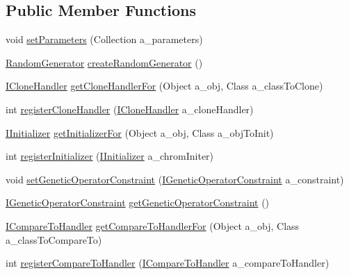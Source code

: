 \subsection*{Public Member Functions}
\begin{DoxyCompactItemize}
\item 
void \hyperlink{interfaceorg_1_1jgap_1_1_i_j_g_a_p_factory_a961d4f7aba61865c46317ddd0db81358}{set\-Parameters} (Collection a\-\_\-parameters)
\item 
\hyperlink{interfaceorg_1_1jgap_1_1_random_generator}{Random\-Generator} \hyperlink{interfaceorg_1_1jgap_1_1_i_j_g_a_p_factory_ad65114627f17dfb8a6bb76324976d016}{create\-Random\-Generator} ()
\item 
\hyperlink{interfaceorg_1_1jgap_1_1_i_clone_handler}{I\-Clone\-Handler} \hyperlink{interfaceorg_1_1jgap_1_1_i_j_g_a_p_factory_ae05d83e21250539af1d719307e5cc18a}{get\-Clone\-Handler\-For} (Object a\-\_\-obj, Class a\-\_\-class\-To\-Clone)
\item 
int \hyperlink{interfaceorg_1_1jgap_1_1_i_j_g_a_p_factory_a084d8313d7c1b01bfa82d7f4f2a1eb0c}{register\-Clone\-Handler} (\hyperlink{interfaceorg_1_1jgap_1_1_i_clone_handler}{I\-Clone\-Handler} a\-\_\-clone\-Handler)
\item 
\hyperlink{interfaceorg_1_1jgap_1_1_i_initializer}{I\-Initializer} \hyperlink{interfaceorg_1_1jgap_1_1_i_j_g_a_p_factory_a21ba92c650de3a43c4981db5516db057}{get\-Initializer\-For} (Object a\-\_\-obj, Class a\-\_\-obj\-To\-Init)
\item 
int \hyperlink{interfaceorg_1_1jgap_1_1_i_j_g_a_p_factory_a9bc3197a5096c07afe50dbb4f756f675}{register\-Initializer} (\hyperlink{interfaceorg_1_1jgap_1_1_i_initializer}{I\-Initializer} a\-\_\-chrom\-Initer)
\item 
void \hyperlink{interfaceorg_1_1jgap_1_1_i_j_g_a_p_factory_aaf690527d7f4d5a0077d139233395398}{set\-Genetic\-Operator\-Constraint} (\hyperlink{interfaceorg_1_1jgap_1_1_i_genetic_operator_constraint}{I\-Genetic\-Operator\-Constraint} a\-\_\-constraint)
\item 
\hyperlink{interfaceorg_1_1jgap_1_1_i_genetic_operator_constraint}{I\-Genetic\-Operator\-Constraint} \hyperlink{interfaceorg_1_1jgap_1_1_i_j_g_a_p_factory_af4e3b7e7a1ee6e0d2cc3848da31919fd}{get\-Genetic\-Operator\-Constraint} ()
\item 
\hyperlink{interfaceorg_1_1jgap_1_1_i_compare_to_handler}{I\-Compare\-To\-Handler} \hyperlink{interfaceorg_1_1jgap_1_1_i_j_g_a_p_factory_acb4e730eff1109209283d89b290ccd53}{get\-Compare\-To\-Handler\-For} (Object a\-\_\-obj, Class a\-\_\-class\-To\-Compare\-To)
\item 
int \hyperlink{interfaceorg_1_1jgap_1_1_i_j_g_a_p_factory_a2716532fe9916e5d13dd8c702fcb9a17}{register\-Compare\-To\-Handler} (\hyperlink{interfaceorg_1_1jgap_1_1_i_compare_to_handler}{I\-Compare\-To\-Handler} a\-\_\-compare\-To\-Handler)
\end{DoxyCompactItemize}
